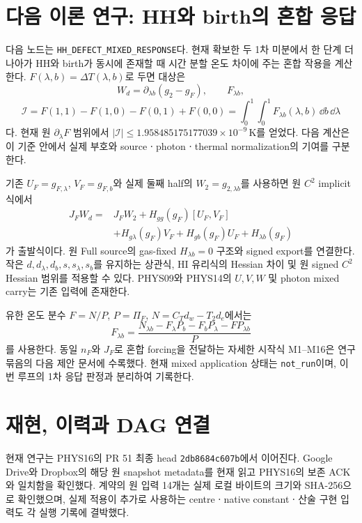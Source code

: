 \section{다음 이론 연구: HH와 birth의 혼합 응답}
\label{sec:next}
다음 노드는 \texttt{HH\_DEFECT\_MIXED\_RESPONSE}다. 현재 확보한 두 1차 미분에서 한 단계 더 나아가 HH와 birth가 동시에 존재할 때 시간 분할 온도 차이에 주는 혼합 작용을 계산한다. $F(\lambda,b)=\Delta T(\lambda,b)$로 두면 대상은
\[
W_d=\partial_{\lambda b}(g_2-g_F),\qquad F_{\lambda b},
\]
\[
\mathcal I=F(1,1)-F(1,0)-F(0,1)+F(0,0)
=\int_0^1\!\int_0^1F_{\lambda b}(\lambda,b)\,\dd b\,\dd\lambda
\]
다. 현재 원 $\partial_\lambda F$ 범위에서 $|\mathcal I|\le1.958485175177039\times10^{-9}\,\mathrm K$를 얻었다. 다음 계산은 이 기준 안에서 실제 부호와 sourceㆍphotonㆍthermal normalization의 기여를 구분한다.

기존 $U_F=g_{F,\lambda}$, $V_F=g_{F,b}$와 실제 둘째 half의 $W_2=g_{2,\lambda b}$를 사용하면 원 $C^2$ implicit 식에서
\[
\begin{aligned}
J_FW_d={}&J_FW_2+H_{gg}(g_F)[U_F,V_F]\\
&+H_{g\lambda}(g_F)V_F+H_{gb}(g_F)U_F+H_{\lambda b}(g_F)
\end{aligned}
\]
가 출발식이다. 원 Full source의 gas-fixed $H_{\lambda b}=0$ 구조와 signed export를 연결한다. 작은 $d,d_\lambda,d_b,s,s_\lambda,s_b$를 유지하는 상관식, HI 유리식의 Hessian 차이 및 원 signed $C^2$ Hessian 범위를 적용할 수 있다. PHYS09와 PHYS14의 $U,V,W$ 및 photon mixed carry는 기존 입력에 존재한다.

유한 온도 분수 $F=N/P$, $P=\Pi_F$, $N=C_Td_w-T_2d_e$에서는
\[
F_{\lambda b}=\frac{N_{\lambda b}-F_\lambda P_b-F_bP_\lambda-FP_{\lambda b}}{P}
\]
를 사용한다. 동일 $n_F$와 $J_F$로 혼합 forcing을 전달하는 자세한 시작식 M1--M16은 연구 묶음의 다음 제안 문서에 수록했다. 현재 mixed application 상태는 \texttt{not\_run}이며, 이번 루프의 1차 응답 판정과 분리하여 기록한다.

\section{재현, 이력과 DAG 연결}
\label{sec:reproduce}
현재 연구는 PHYS16의 PR 51 최종 head \texttt{2db8684c607b}에서 이어진다. Google Drive와 Dropbox의 해당 원 snapshot metadata를 현재 읽고 PHYS16의 보존 ACK와 일치함을 확인했다. 계약의 원 입력 14개는 실제 로컬 바이트의 크기와 SHA-256으로 확인했으며, 실제 적용이 추가로 사용하는 centreㆍnative constantㆍ산술 구현 입력도 각 실행 기록에 결박했다.

